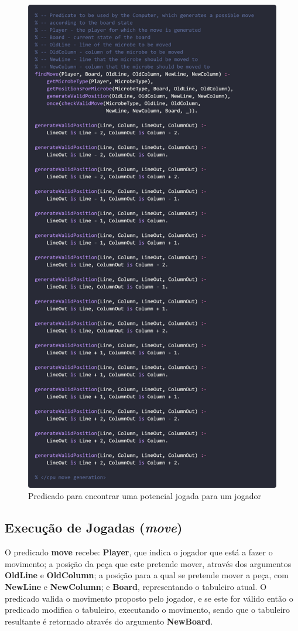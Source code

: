 \documentclass[a4paper]{article}
\begin{document}
\newpage
\begin{figure}[hbp!]
    \centering
    \includegraphics[width=.7\linewidth]{prints/move-generation-2.png}
    \caption{Predicado para encontrar uma potencial jogada para um jogador}
    \label{fig}
\end{figure}

\newpage\subsection{Execução de Jogadas (\textit{move})} 

\bigskip
O predicado \textbf{move} recebe: \textbf{Player}, que indica o jogador que está a fazer o movimento; a posição da peça que este pretende mover, através dos argumentos \textbf{OldLine} e \textbf{OldColumn}; a posição para a qual se pretende mover a peça, com \textbf{NewLine} e \textbf{NewColumn}; e \textbf{Board}, representando o tabuleiro atual. O predicado valida o movimento proposto pelo jogador, e se este for válido então o predicado modifica o tabuleiro, executando o movimento, sendo que o tabuleiro resultante é retornado através do argumento \textbf{NewBoard}. 
\end{document}
